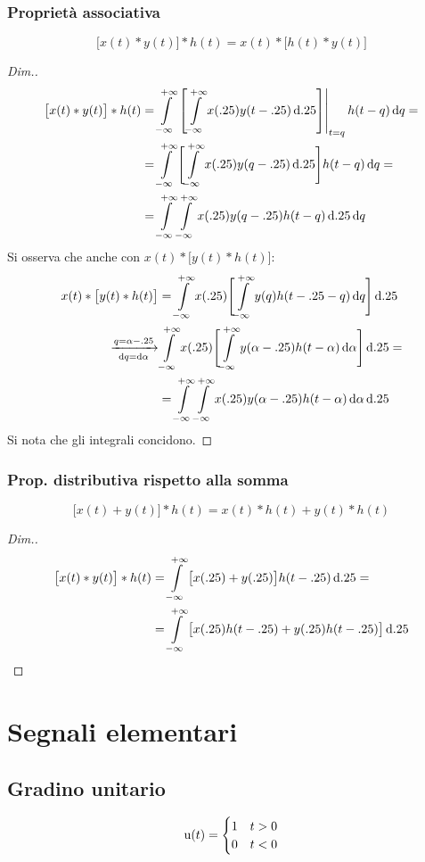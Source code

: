 \subsubsection{Proprietà associativa}
\begin{equation}
\bigl[x(t)\ast y(t)\bigr]\ast h(t)= x(t)\ast\bigl[h(t)\ast y(t)\bigr]
\end{equation}
\begin{proof}[Dim.]
\begin{align*}
	\bigl[x(t)\ast y(t)\bigr]\ast h(t)
	&= \intinf{\bound{t=q}{}{\intinf{x(\tau)y(t-\tau)}{\tau}}h(t-q)}{q} = \\
	&= \intinf{\Biggl[\intinf{x(\tau)y(q-\tau)}{\tau}\Biggr]h(t-q)}{q} = \\
	&= \intinf{\intinf{x(\tau)y(q-\tau)h(t-q)}{\tau}}{q}
\end{align*}
Si osserva che anche con $x(t)\ast \bigl[y(t) \ast h(t)\bigr]$:
\begin{align*}
	x(t)\ast\bigl[y(t) \ast h(t)\bigr]
	&= \intinf{x(\tau)\Biggl[\intinf{y(q)h(t-\tau-q)}{q}\Biggr]}{\tau} \\
	\xrightarrow[\diff{q}=\diff\alpha]{q=\alpha-\tau}
	& \intinf{x(\tau)\Biggl[\intinf{y(\alpha-\tau)h(t-\alpha)}{\alpha}\Biggr]}{\tau} = \\
	&= \intinf{\intinf{x(\tau)y(\alpha-\tau)h(t-\alpha)}{\alpha}}{\tau}
\end{align*}
Si nota che gli integrali concidono.
\end{proof}
\subsubsection{Prop. distributiva rispetto alla somma}
\begin{equation}
\bigl[x(t)+y(t)\bigr]\ast h(t)= x(t)\ast h(t)+y(t)\ast h(t)
\end{equation}
\begin{proof}[Dim.]
\begin{align*}
	\bigl[x(t)\ast y(t)\bigr]\ast h(t)
	&= \intinf{\bigl[x(\tau) + y(\tau)\bigr]h(t-\tau)}{\tau} = \\
	&= \intinf{\bigl[x(\tau)h(t-\tau)+y(\tau)h(t-\tau)\bigr]}{\tau}
	\qedhere
\end{align*}
\end{proof}

\section{Segnali elementari}
\subsection{Gradino unitario}
\begin{equation}
\step(t)=\begin{cases}
1 & t>0 \\
0 & t<0
\end{cases}
\end{equation}
